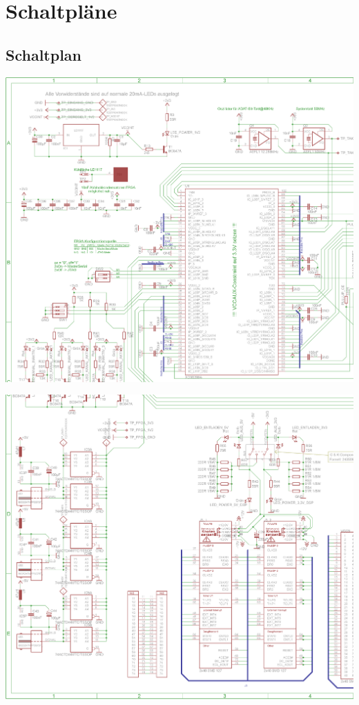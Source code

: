 
\chapter{Schaltpläne}
	\section{Schaltplan}
		\includegraphics[width=\linewidth]{Medien/schaltplan1.png}
		\clearpage
		
		\noindent
		\includegraphics[width=\linewidth]{Medien/schaltplan2.png}
		\clearpage
		 
